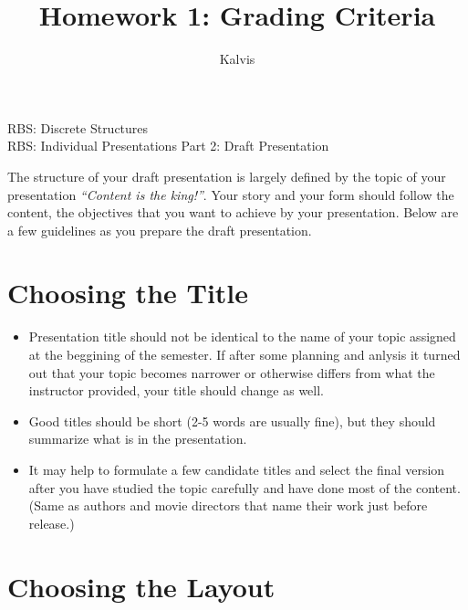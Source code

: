 \documentclass[jou]{apa6}
\title{Homework 1: Grading Criteria}
\author{Kalvis}
\affiliation{RBS}
\begin{document}
\thispagestyle{empty}


\begin{center}
{\Large RBS: Discrete Structures}\\
{\Large RBS: Individual Presentations Part 2: Draft Presentation}
\end{center}

The structure of your draft presentation is largely defined by the topic of your presentation
\textendash{} {\em ``Content is the king!''}. Your story and your form should follow the 
content, the objectives that you want to achieve by your presentation.
Below are a few guidelines as you prepare the draft presentation.


\section{Choosing the Title}

\begin{itemize}
\item Presentation title should not be identical 
to the name of your topic assigned at the beggining of the semester. 
If after some planning and anlysis it turned out that 
your topic becomes narrower or otherwise differs from what the instructor provided, 
your title should change as well.
\item Good titles should be short (2-5 words are usually fine), but they should
summarize what is in the presentation.
\item It may help to formulate a few candidate titles 
and select the final version after you have studied the topic carefully and
have done most of the content. (Same as authors and movie directors that 
name their work just before release.)
\end{itemize}


\section{Choosing the Layout}
\end{document}
